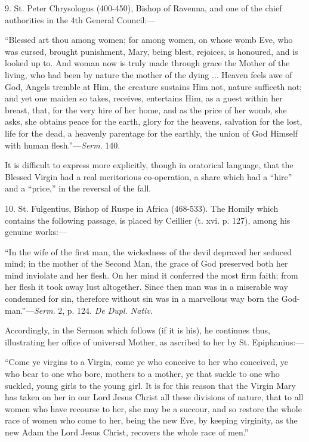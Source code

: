 9. St. Peter Chrysologus (400-450), Bishop of Ravenna, and one of the
chief authorities in the 4th General Council:—

``Blessed art thou among women; for among women, on whose womb Eve,
who was cursed, brought punishment, Mary, being blest, rejoices, is
honoured, and is looked up to. And woman now is truly made through grace
the Mother of the living, who had been by nature the mother of the dying
... Heaven feels awe of God, Angels tremble at Him, the creature
sustains Him not, nature sufficeth not; and yet one maiden so takes,
receives, entertains Him, as a guest within her breast, that, for
the very hire of her home, and as the price of her womb, she asks, she
obtains peace for the earth, glory for the heavens, salvation for the
lost, life for the dead, a heavenly parentage for the earthly, the union
of God Himself with human flesh.''—\emph{Serm}. 140.

It is difficult to express more explicitly, though in oratorical
language, that the Blessed Virgin had a real meritorious co-operation, a
share which had a ``hire'' and a ``price,'' in the
reversal of the fall.

10. St. Fulgentius, Bishop of Ruspe in Africa (468-533). The Homily
which contains the following passage, is placed by Ceillier (t. xvi. p.
127), among his genuine works:—

``In the wife of the first man, the wickedness of the devil depraved
her seduced mind; in the mother of the Second Man, the grace of God
preserved both her mind inviolate and her flesh. On her mind it
conferred the most firm faith; from her flesh it took away lust
altogether. Since then man was in a miserable way condemned for sin,
therefore without sin was in a marvellous way born the God-man.''—\emph{Serm}.
2, p. 124. \emph{De Dupl. Nativ}.

Accordingly, in the Sermon which follows (if it is his), he continues
thus, illustrating her office of universal Mother, as ascribed to her by
St. Epiphanius:—

``Come ye virgins to a Virgin, come ye who conceive to her who
conceived, ye who bear to one who bore, mothers to a mother, ye that
suckle to one who suckled, young girls to the young girl. It is for this
reason that the Virgin Mary has taken on her in our Lord Jesus Christ
all these divisions of nature, that to all women who have recourse
to her, she may be a succour, and so restore the whole race of women who
come to her, being the new Eve, by keeping virginity, as the new Adam
the Lord Jesus Christ, recovers the whole race of men.''

